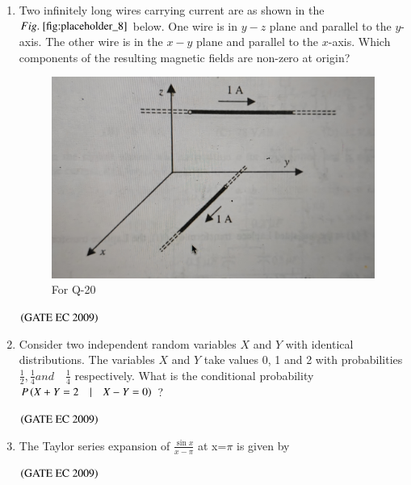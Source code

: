 \documentclass[journal,12pt,onecolumn]{IEEEtran}
\theoremstyle{remark}
\begin{document}
\begin{enumerate}
\item Two infinitely long wires carrying current are as shown in the $\figref{fig:placeholder_8}$ below. One wire is in $y-z$ plane and parallel to the $y$-axis. The other wire is in the $x-y$ plane and parallel to the $x$-axis. Which components of the resulting magnetic fields are non-zero at origin?
\begin{figure}[H]
    \centering
    \includegraphics[width=0.5\columnwidth]{figs/fig_8.jpg}
    \caption{\centering For Q-20}
    \label{fig:placeholder_8}
\end{figure}
\begin{enumerate}
\end{enumerate}
\hfill $\brak{\text{GATE EC 2009}}$
\item Consider two independent random variables $X$ and $Y$ with identical distributions. The variables $X$ and $Y$ take values 0, 1 and 2 with probabilities $\frac{1}{2}, \frac{1}{4} and  \quad \frac{1}{4}$ respectively. What is the conditional probability $P\brak{X+Y=2 \quad| \quad X-Y=0}$ ?

\begin{enumerate}
\end{enumerate}
\hfill $\brak{\text{GATE EC 2009}}$

\item The Taylor series expansion of $\frac{\sin x}{x-\pi}$ at x=$\pi$ is given by
\begin{enumerate}
\end{enumerate}
\hfill $\brak{\text{GATE EC 2009}}$


\end{enumerate}
\end{document}
